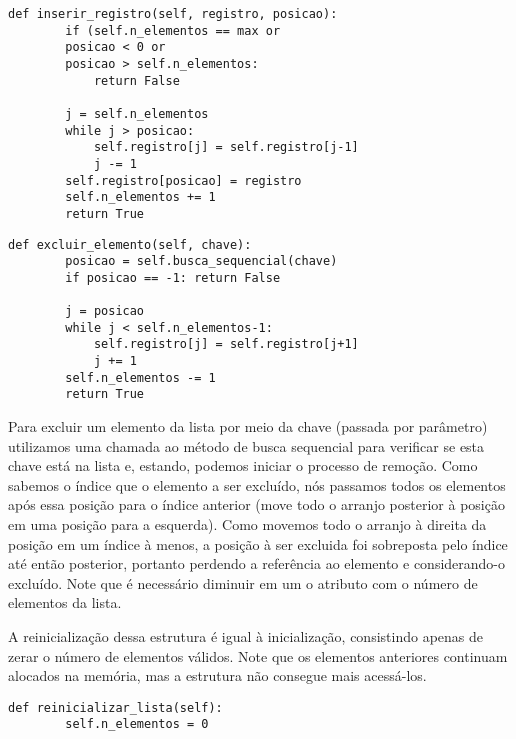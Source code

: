 \documentclass[a4paper, twocolumn]{article}
\theoremstyle{definition}
\begin{document}
\begin{lstlisting}[label=lista_linear_seq,caption= Lista linear sequencial (inserção)]
def inserir_registro(self, registro, posicao):
        if (self.n_elementos == max or 
        posicao < 0 or 
        posicao > self.n_elementos:
            return False

        j = self.n_elementos
        while j > posicao:
            self.registro[j] = self.registro[j-1]
            j -= 1
        self.registro[posicao] = registro
        self.n_elementos += 1
        return True
\end{lstlisting}


\begin{lstlisting}[label=lista_linear_seq,caption= Lista linear sequencial (remoção)]
def excluir_elemento(self, chave):
        posicao = self.busca_sequencial(chave)
        if posicao == -1: return False

        j = posicao
        while j < self.n_elementos-1:
            self.registro[j] = self.registro[j+1]
            j += 1
        self.n_elementos -= 1
        return True
\end{lstlisting}

Para excluir um elemento da lista por meio da chave (passada por parâmetro) utilizamos uma chamada ao método de busca sequencial para verificar se esta chave está na lista e, estando, podemos iniciar o processo de remoção. Como sabemos o índice que o elemento a ser excluído, nós passamos todos os elementos após essa posição para o índice anterior (move todo o arranjo posterior à posição em uma posição para a esquerda). Como movemos todo o arranjo à direita da posição em um índice à menos, a posição à ser excluida foi sobreposta pelo índice até então posterior, portanto perdendo a referência ao elemento e considerando-o excluído. Note que é necessário diminuir em um o atributo com o número de elementos da lista.

A reinicialização dessa estrutura é igual à inicialização, consistindo apenas de zerar o número de elementos válidos. Note que os elementos anteriores continuam alocados na memória, mas a estrutura não consegue mais acessá-los.

\begin{lstlisting}[label=lista_linear_seq,caption= Lista linear sequencial (reinicialização)]
def reinicializar_lista(self):
        self.n_elementos = 0
\end{lstlisting}
\end{document}
